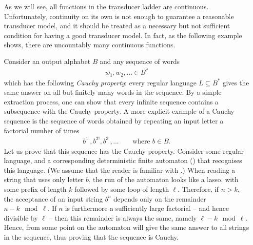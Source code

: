 As we will see, all functions in the transducer ladder are  continuous. Unfortunately, continuity on its own is not enough to guarantee a reasonable transducer model, and it should be treated as a necessary but not sufficient condition for having a good transducer model. In fact, as the following example shows, there are uncountably many continuous functions.

\begin{myexample}\label{ex:uncountably-many-continuous}
    Consider an output alphabet $B$ and any sequence of words 
    \begin{align*}
    w_1, w_2, \ldots \in B^*
    \end{align*}
    which has the following \emph{Cauchy property}: every regular language $L \subseteq B^*$ gives the same answer on all but finitely many words in the sequence. By a simple extraction process, one can show that every infinite sequence contains a subsequence with the Cauchy property. A more explicit example of a Cauchy sequence is the sequence of words obtained by repeating an input letter a  factorial number of times
    \begin{align*}
    b^{1!}, b^{2!}, b^{3!},\ldots \qquad \text{where $b \in B$.}
    \end{align*}
    Let us prove that this sequence has the Cauchy property. Consider some regular language, and a corresponding  deterministic finite automaton (\dfa) that recognises this language. (We assume that the reader is familiar with \dfa.)  When reading a string that uses only letter $b$, the run of the automaton looks like a lasso, with some prefix of  length $k$ followed by  some loop of length $\ell$. Therefore, if  $n > k$, the acceptance of an input string $b^n$ depends only on  the remainder $n-k \mod \ell$. If $n$ is furthermore  a sufficiently large factorial -- and hence divisible by $\ell$ --  then this remainder is always the same, namely $\ell - k \mod \ell$. Hence, from some point on the automaton will give the same answer to all strings in the sequence, thus proving that the sequence is Cauchy. 


\end{myexample}
